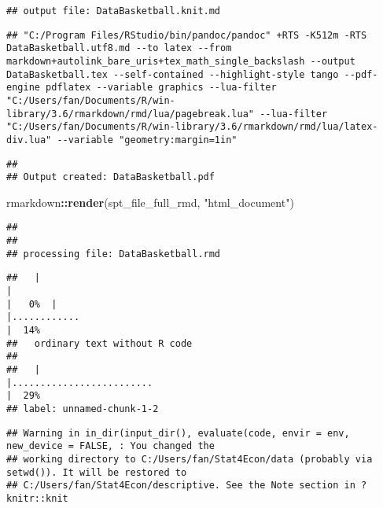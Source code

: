 \documentclass[
]{article}
\newenvironment{Shaded}{\begin{snugshade}}{\end{snugshade}}
\newcommand{\KeywordTok}[1]{\textcolor[rgb]{0.13,0.29,0.53}{\textbf{#1}}}
\newcommand{\NormalTok}[1]{#1}
\newcommand{\OperatorTok}[1]{\textcolor[rgb]{0.81,0.36,0.00}{\textbf{#1}}}
\newcommand{\StringTok}[1]{\textcolor[rgb]{0.31,0.60,0.02}{#1}}
\begin{document}
\begin{verbatim}
## output file: DataBasketball.knit.md
\end{verbatim}

\begin{verbatim}
## "C:/Program Files/RStudio/bin/pandoc/pandoc" +RTS -K512m -RTS DataBasketball.utf8.md --to latex --from markdown+autolink_bare_uris+tex_math_single_backslash --output DataBasketball.tex --self-contained --highlight-style tango --pdf-engine pdflatex --variable graphics --lua-filter "C:/Users/fan/Documents/R/win-library/3.6/rmarkdown/rmd/lua/pagebreak.lua" --lua-filter "C:/Users/fan/Documents/R/win-library/3.6/rmarkdown/rmd/lua/latex-div.lua" --variable "geometry:margin=1in"
\end{verbatim}

\begin{verbatim}
## 
## Output created: DataBasketball.pdf
\end{verbatim}

\begin{Shaded}
\begin{Highlighting}[]
\NormalTok{rmarkdown}\OperatorTok{::}\KeywordTok{render}\NormalTok{(spt_file_full_rmd, }\StringTok{"html_document"}\NormalTok{)}
\end{Highlighting}
\end{Shaded}

\begin{verbatim}
## 
## 
## processing file: DataBasketball.rmd
\end{verbatim}

\begin{verbatim}
##   |                                                                                              |                                                                                      |   0%  |                                                                                              |............                                                                          |  14%
##   ordinary text without R code
## 
##   |                                                                                              |.........................                                                             |  29%
## label: unnamed-chunk-1-2
\end{verbatim}

\begin{verbatim}
## Warning in in_dir(input_dir(), evaluate(code, envir = env, new_device = FALSE, : You changed the
## working directory to C:/Users/fan/Stat4Econ/data (probably via setwd()). It will be restored to
## C:/Users/fan/Stat4Econ/descriptive. See the Note section in ?knitr::knit
\end{verbatim}
\end{document}
